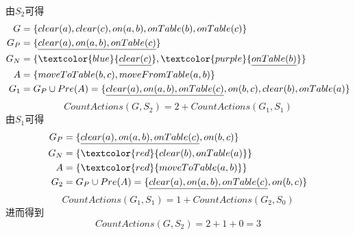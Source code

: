 \documentclass[a4paper, 11pt]{article}
\begin{document}
\begin{answer}
\begin{itemize}
\begin{figure}[H]
    \end{figure}
    由$S_2$可得
    \[\begin{aligned}
        G&=\{clear(a),clear(c),on(a,b),onTable(b),onTable(c)\}\\
        G_P&=\{\underline{clear(a),on(a,b),onTable(c)}\}\\
        G_N&=\{\textcolor{blue}{\underline{clear(c)}},\textcolor{purple}{\underline{onTable(b)}}\}\\
        A&=\{moveToTable(b,c),moveFromTable(a,b)\}\\
        G_1&=G_P\cup Pre(A)=\{\underline{clear(a),on(a,b),onTable(c)},on(b,c),clear(b),onTable(a)\}
    \end{aligned}\]
    \[CountActions(G,S_2)=2+CountActions(G_1,S_1)\]
    由$S_1$可得
    \[\begin{aligned}
        G_P&=\{\underline{clear(a),on(a,b),onTable(c)},on(b,c)\}\\
        G_N&=\{\textcolor{red}{clear(b),onTable(a)}\}\\
        A&=\{\textcolor{red}{moveToTable(a,b)}\}\\
        G_2&=G_P\cup Pre(A)=\{\underline{clear(a),on(a,b),onTable(c)},on(b,c)\}
    \end{aligned}\]
    \[CountActions(G_1,S_1)=1+CountActions(G_2,S_0)\]
    进而得到
    \[CountActions(G,S_2)=2+1+0=3\]
\end{itemize}
\end{answer}
\end{document}
